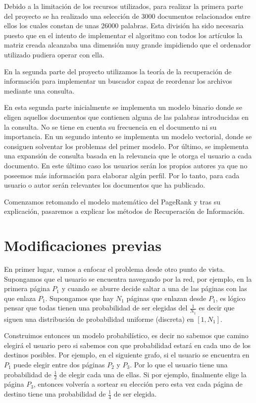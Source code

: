 \documentclass[size=a4, parskip=half, titlepage=false, toc=flat, toc=bib, 12pt]{scrartcl}
\theoremstyle{theorem-style}
\theoremstyle{definition-style}
\theoremstyle{remark-style}
\theoremstyle{example-style}
\theoremstyle{definition-style}
\theoremstyle{remark-style}
\begin{document}
Debido a la limitación de los recursos utilizados, para realizar la primera parte del proyecto se ha realizado una selección de 3000 documentos relacionados entre ellos los cuales constan de unas 26000 palabras. Esta división ha sido necesaria puesto que en el intento de implementar el algoritmo con todos los artículos la matriz creada alcanzaba una dimensión muy grande impidiendo que el ordenador utilizado pudiera operar con ella.

En la segunda parte del proyecto utilizamos la teoría de la recuperación de información para implementar un buscador capaz de reordenar los archivos mediante una consulta.

En esta segunda parte inicialmente se implementa un modelo binario donde se eligen aquellos documentos que contienen alguna de las palabras introducidas en la consulta. No se tiene en cuenta su frecuencia en el documento ni su importancia. En un segundo intento se implementa un modelo vectorial, donde se consiguen solventar los problemas del primer modelo. Por último, se implementa una expansión de consulta basada en la relevancia que le otorga el usuario a cada documento. En este último caso los usuarios serán los propios autores ya que no poseemos más información para elaborar algún perfil. Por lo tanto, para cada usuario o autor serán relevantes los documentos que ha publicado.

Comenzamos retomando el modelo matemático del PageRank y tras su explicación, pasaremos a explicar los métodos de Recuperación de Información.

\newpage

\section{Modificaciones previas}

En primer lugar, vamos a enfocar el problema desde otro punto de vista. Supongamos que el usuario se encuentra navegando por la red, por ejemplo, en la primera página $P_1$ y cuando se aburre decide saltar a una de las páginas con las que enlaza $P_1$. Supongamos que hay $N_1$ páginas que enlazan desde $P_1$, es lógico pensar que todas tienen una probabilidad de ser elegidas del $\frac{1}{N_1}$ es decir que siguen una distribución de probabilidad uniforme (discreta) en $[1, N_1]$.

Construimos entonces un modelo probabilístico, es decir no sabemos que camino elegirá el usuario pero si sabemos con que probabilidad estará en cada uno de los destinos posibles. Por ejemplo, en el siguiente grafo, si el usuario se encuentra en $P_1$ puede elegir entre dos páginas $P_2$ y $P_3$. Por lo que el usuario tiene una probabilidad de $\frac{1}{2}$ de elegir cada una de ellas. Si por ejemplo, finalmente elige la página $P_3$, entonces volvería a sortear su elección pero esta vez cada página de destino tiene una probabilidad de $\frac{1}{4}$ de ser elegida.
\end{document}
